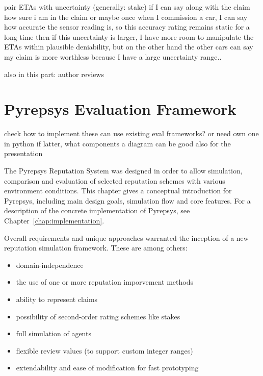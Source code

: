 \documentclass[%
    ]{\PathToTumTemplate/thesis/tum_thesis}
\begin{document}
pair ETAs with uncertainty (generally: stake)
if I can say along with the claim how sure i am in the claim
or maybe once when I commission a car, I can say how accurate the sensor reading is, so this accuracy rating remains static for a long time
then if this uncertainty is larger, I have more room to manipulate the ETAs within plausible deniability, but on the other hand the other cars can say my claim is more worthless because I have a large uncertainty range..


also in this part: author reviews




\section{Pyrepsys Evaluation Framework}\label{sec:approach_evaluation_framework}

check how to implement these
can use existing eval frameworks? or need own one in python
if latter, what components
a diagram can be good also for the presentation



The Pyrepsys Reputation System was designed in order to allow simulation, comparison and evaluation of selected reputation schemes with various environment conditions. 
This chapter gives a conceptual introduction for Pyrepsys, including main design goals, simulation flow and core features.
For a description of the concrete implementation of Pyrepsys, see Chapter~\ref{chap:implementation}.

Overall requirements and unique approaches warranted the inception of a new reputation simulation framework. 
These are among others:
\begin{itemize}
    \item domain-independence
    \item the use of one or more reputation imporvement methods
    \item ability to represent \glspl{claim}
    \item possibility of second-order rating schemes like stakes
    \item full simulation of agents
    \item flexible review values (to support custom integer ranges)
    \item extendability and ease of modification for fast prototyping
\end{itemize}
\end{document}
